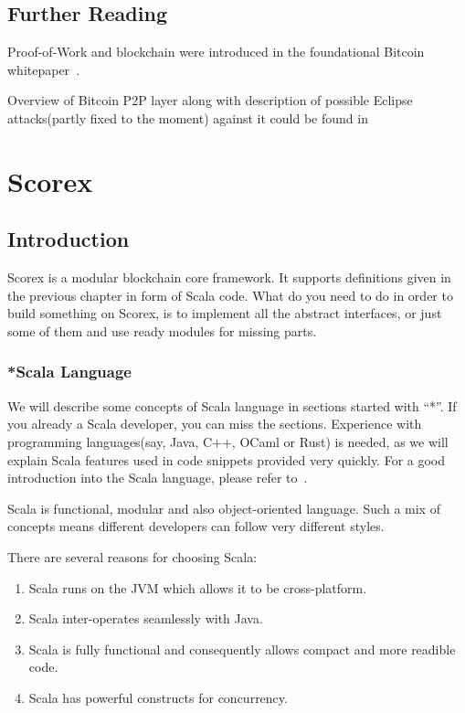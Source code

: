 \documentclass[]{report}   %
\begin{document}
\section{Further Reading}

Proof-of-Work and blockchain were introduced in the foundational Bitcoin whitepaper~\cite{Nakamoto2008}.

Overview of Bitcoin P2P layer along with description of possible Eclipse attacks(partly fixed to the moment) against it could be found in~\cite{heilman2015eclipse}


\chapter{Scorex}           %
\section{Introduction}     %

Scorex is a modular blockchain core framework. It supports definitions given in the previous chapter in form of Scala code. What do you need to do in order to build something on Scorex, is to implement all the abstract interfaces, or just some of them and use ready modules for missing parts.

\subsection{*Scala Language}         %

We will describe some concepts of Scala language in sections started with ``*''. If you already a Scala developer, you can miss the sections. Experience with programming languages(say, Java, C++, OCaml or Rust) is needed, as we will explain Scala features used in code snippets provided very quickly. For a good introduction into the Scala language, please refer to~\cite{odersky2008programming}.

Scala is functional, modular and also object-oriented language. Such a mix of concepts means different developers can follow very different styles. 

There are several reasons for choosing Scala:
\begin{enumerate}
	\item Scala runs on the JVM which allows it to be cross-platform.
	\item Scala inter-operates seamlessly with Java.
	\item Scala is fully functional and consequently allows compact and more readible code.
	\item Scala has powerful constructs for concurrency.
	
\end{enumerate}
\end{document}
